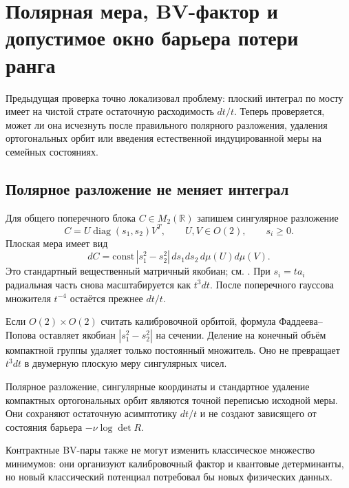 \chapter{Полярная мера, BV-фактор и допустимое окно барьера потери ранга}

Предыдущая проверка точно локализовал проблему: плоский интеграл по мосту
имеет на чистой страте остаточную расходимость $dt/t$. Теперь проверяется,
может ли она исчезнуть после правильного полярного разложения, удаления
ортогональных орбит или введения естественной индуцированной меры на
семейных состояниях.

\section{Полярное разложение не меняет интеграл}

Для общего поперечного блока $C\in M_2(\mathbb R)$ запишем сингулярное
разложение
\begin{equation}
 C=U\operatorname{diag}(s_1,s_2)V^T,
 \qquad U,V\in O(2),\qquad s_i\geq0.
\end{equation}
Плоская мера имеет вид
\begin{equation}
 dC=\mathrm{const}\,
 |s_1^2-s_2^2|\,ds_1ds_2\,d\mu(U)d\mu(V).
 \label{eq:v6-real-m2-svd-measure}
\end{equation}
Это стандартный вещественный матричный якобиан; см.
. При $s_i=t a_i$ радиальная часть снова
масштабируется как $t^3dt$. После поперечного гауссова множителя $t^{-4}$
остаётся прежнее $dt/t$.

Если $O(2)\times O(2)$ считать калибровочной орбитой, формула Фаддеева--
Попова оставляет якобиан $|s_1^2-s_2^2|$ на сечении. Деление на конечный
объём компактной группы удаляет только постоянный множитель. Оно не
превращает $t^3dt$ в двумерную плоскую меру сингулярных чисел.

\begin{theorem}
Полярное разложение, сингулярные координаты и стандартное удаление
компактных ортогональных орбит являются точной переписью исходной меры.
Они сохраняют остаточную асимптотику $dt/t$ и не создают зависящего от
состояния барьера $-\nu\log\det R$.
\end{theorem}

Контрактные BV-пары также не могут изменить классическое множество
минимумов: они организуют калибровочный фактор и квантовые детерминанты,
но новый классический потенциал потребовал бы новых физических данных.


